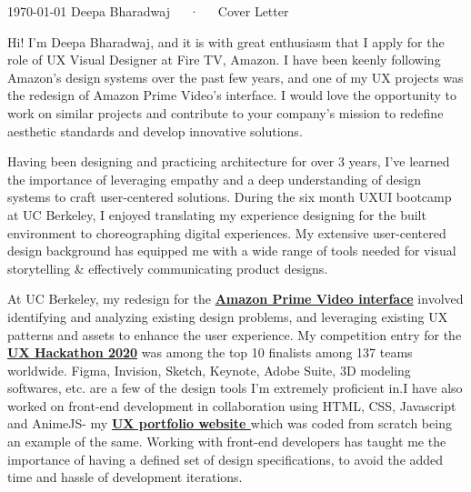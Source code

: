 \documentclass[11pt, a4paper]{awesome-cv}
\begin{document}
\makecvheader[R]

\makecvfooter
  {\today}
  {Deepa Bharadwaj~~~·~~~Cover Letter}
  {}

\makelettertitle

\begin{cvletter}

Hi! I'm Deepa Bharadwaj, and it is with great enthusiasm that I apply for the role of UX Visual Designer at Fire TV, Amazon. I have been keenly following Amazon's design systems over the past few years, and one of my UX projects was the redesign of Amazon Prime Video's interface. I would love the opportunity to work on similar projects and contribute to your company's mission to redefine aesthetic standards and develop innovative solutions.

Having been designing and practicing architecture for over 3 years, I've learned the importance of leveraging empathy and a deep understanding of design systems to craft user-centered solutions. During the six month UXUI bootcamp at UC Berkeley, I enjoyed translating my experience designing for the built environment to choreographing digital experiences. My extensive user-centered design background has equipped me with a wide range of tools needed for visual storytelling \& effectively communicating product designs.



At UC Berkeley, my redesign for the \textbf{\href{http://bit.ly/primevideocasestudy}{Amazon Prime Video interface}} involved identifying and analyzing existing design problems, and leveraging existing UX patterns and assets to enhance the user experience. My competition entry for the \textbf{\href{http://bit.ly/barkcasestudy}{UX Hackathon 2020}} was among the top 10 finalists among 137 teams worldwide. Figma, Invision, Sketch, Keynote, Adobe Suite, 3D modeling softwares, etc. are a few of the design tools I'm extremely proficient in.I have also worked on front-end development in collaboration using HTML, CSS, Javascript and AnimeJS- my \textbf{\href{http://deepabharadwaj.com}{UX portfolio website }}which was coded from scratch being an example of the same. Working with front-end developers has taught me the importance of having a defined set of design specifications, to avoid the added time and hassle of development iterations.



\end{cvletter}
\end{document}
